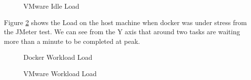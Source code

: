 \begin{figure}[H]
\caption{VMware Idle Load}
\label{fig:VMwareloadidle}
\centering
\end{figure}

Figure \ref{fig:Dockerloadwork} shows the Load on the host machine when docker was under stress from the JMeter test. We can see from the Y axis that around two tasks are waiting more than a minute to be completed at peak. %

\begin{figure}[H]
\caption{Docker Workload Load}
\label{fig:Dockerloadwork}
\centering
\end{figure}



\begin{figure}[H]
\caption{VMware Workload Load}
\label{fig:VMwareloadidle}
\centering
\end{figure}
